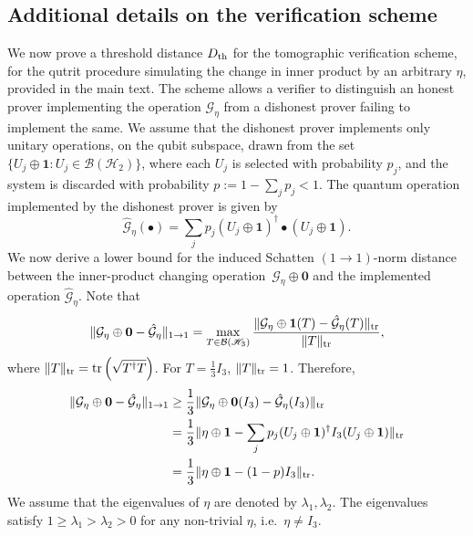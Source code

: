 \documentclass[amsmath,amssymb,aps,pra,superscriptaddress,twocolumn]{revtex4-2}
\begin{document}
\begin{appendix}
\section{{Additional details on the verification scheme}}\label{sec:threshold}
We now prove a threshold distance $D_{\rm th}$ for the tomographic verification scheme, for the 
qutrit procedure simulating the change in inner product by an arbitrary $\eta$, provided in the main text.
The scheme allows
a verifier to distinguish an honest prover implementing the operation $\mathcal{G}_\eta$ 
from a dishonest prover failing to implement the same.
We assume that the dishonest prover implements only unitary operations, on the qubit subspace, drawn from the set  
$\{U_j \oplus \bm{1}: U_j\in\mathcal{B}\left(\mathscr{H}_2\right) \}$, where each $U_j$ is selected with probability $p_j$, 
and the system is discarded with probability $p:=1-\sum_jp_j<1$.
The quantum operation implemented by the dishonest prover is given by 
\begin{equation}
    \hat{\mathcal{G}}_\eta(\bullet) = \sum_jp_j \left(U_j \oplus \bm{1}\right)^\dagger\bullet \left(U_j \oplus \bm{1}\right).
\end{equation}
We now derive a lower bound for the induced Schatten $(1\to 1)$-norm distance~\cite{Pau03} between the 
inner-product changing operation~$\mathcal{G}_\eta\oplus \bm{0}$  
and the implemented operation $\hat{\mathcal{G}}_\eta$.
Note that 
\begin{equation}
    \|\mathcal{G}_\eta\oplus\bm{0}-\hat{\mathcal{G}}_\eta\|_{1\to 1} = \max_{T\in\mathcal{B}\left(\mathscr{H}_3\right)}\frac{  \|\mathcal{G}_\eta\oplus\bm{1}(T)-\hat{\mathcal{G}}_\eta(T)\|_{\rm tr}}{\|T\|_{\rm tr}},
\end{equation}
 where  $\|T\|_{\rm tr} = {\rm tr}\left(\sqrt{T^\dagger T}\right)$.
 For $T = \frac{1}{3}I_3$, $\|T\|_{\rm tr} = 1$. 
 Therefore,
 \begin{align}
      \|\mathcal{G}_\eta\oplus\bm{0}-\hat{\mathcal{G}}_\eta\|_{1\to 1} 
      &\ge 
      \frac{1}{3}\|\mathcal{G}_\eta\oplus \bm{0}(I_3)-\hat{\mathcal{G}}_\eta(I_3)\|_{\rm tr} \nonumber\\
      &= 
      \frac{1}{3}\|\eta\oplus\bm{1}-\sum_jp_j(U_j\oplus\bm{1})^\dagger I_3(U_j\oplus\bm{1})\|_{\rm tr} \nonumber\\
      &= 
       \frac{1}{3}\|\eta\oplus\bm{1}-(1-p)I_3\|_{\rm tr}.
 \end{align}
 We assume that the eigenvalues of $\eta$ are denoted by $\lambda_1,\lambda_2$.
 The eigenvalues satisfy  $1\geq\lambda_1>\lambda_2>0$ for any non-trivial $\eta$, i.e.\ $\eta\neq I_3$.

\end{appendix}
\end{document}
